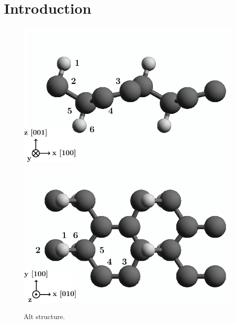 \documentclass[prb,11pt,tightenlines,twocolumn,aps]{revtex4-1}
\begin{document}
\section{Introduction}
\blindtext
\begin{figure}[ht!]
    \centering
    \includegraphics[width=\linewidth]{figures/altstruc2}
    \\
    \includegraphics[width=\linewidth]{figures/altstruc1}
    \caption{Alt structure.}
    \label{fig:alt-struc}
\end{figure}
\end{document}
